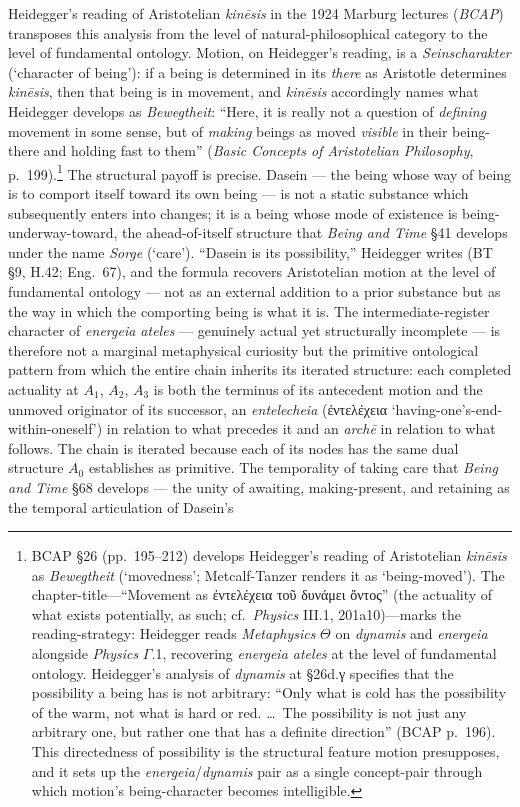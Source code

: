 \documentclass{article}
\newcommand{\gk}[1]{{\greekfont #1}}
\begin{document}
Heidegger's reading of Aristotelian \textit{kinēsis} in the 1924 Marburg lectures (\textit{BCAP}) transposes this analysis from the level of natural-philosophical category to the level of fundamental ontology. Motion, on Heidegger's reading, is a \textit{Seinscharakter} (`character of being'): if a being is determined in its \textit{there} as Aristotle determines \textit{kinēsis}, then that being is in movement, and \textit{kinēsis} accordingly names what Heidegger develops as \textit{Bewegtheit}: ``Here, it is really not a question of \textit{defining} movement in some sense, but of \textit{making} beings as moved \textit{visible} in their being-there and holding fast to them'' (\textit{Basic Concepts of Aristotelian Philosophy}, p.~199).\footnote{BCAP §26 (pp.~195--212) develops Heidegger's reading of Aristotelian \textit{kinēsis} as \textit{Bewegtheit} (`movedness'; Metcalf-Tanzer renders it as `being-moved'). The chapter-title---``Movement as \gk{ἐντελέχεια τοῦ δυνάμει ὄντος}'' (the actuality of what exists potentially, as such; cf.~\textit{Physics} III.1, 201a10)---marks the reading-strategy: Heidegger reads \textit{Metaphysics} $\Theta$ on \textit{dynamis} and \textit{energeia} alongside \textit{Physics} $\Gamma$.1, recovering \textit{energeia ateles} at the level of fundamental ontology. Heidegger's analysis of \textit{dynamis} at §26d.γ specifies that the possibility a being has is not arbitrary: ``Only what is cold has the possibility of the warm, not what is hard or red. \ldots\ The possibility is not just any arbitrary one, but rather one that has a definite direction'' (BCAP p.~196). This directedness of possibility is the structural feature motion presupposes, and it sets up the \textit{energeia}/\textit{dynamis} pair as a single concept-pair through which motion's being-character becomes intelligible.} The structural payoff is precise. Dasein --- the being whose way of being is to comport itself toward its own being --- is not a static substance which subsequently enters into changes; it is a being whose mode of existence is being-underway-toward, the ahead-of-itself structure that \textit{Being and Time} \S 41 develops under the name \textit{Sorge} (`care'). ``Dasein is its possibility,'' Heidegger writes (BT \S 9, H.42; Eng.~67), and the formula recovers Aristotelian motion at the level of fundamental ontology --- not as an external addition to a prior substance but as the way in which the comporting being is what it is. The intermediate-register character of \textit{energeia ateles} --- genuinely actual yet structurally incomplete --- is therefore not a marginal metaphysical curiosity but the primitive ontological pattern from which the entire chain inherits its iterated structure: each completed actuality at $A_1$, $A_2$, $A_3$ is both the terminus of its antecedent motion and the unmoved originator of its successor, an \textit{entelecheia} (\gk{ἐντελέχεια} `having-one's-end-within-oneself') in relation to what precedes it and an \textit{archē} in relation to what follows. The chain is iterated because each of its nodes has the same dual structure $A_0$ establishes as primitive. The temporality of taking care that \textit{Being and Time} \S 68 develops --- the unity of awaiting, making-present, and retaining as the temporal articulation of Dasein's 
\end{document}
